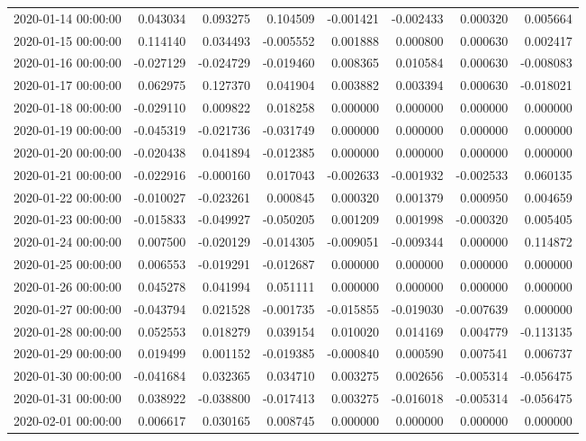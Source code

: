 \begin{tabular}{lrrrrrrr}
2020-01-14 00:00:00 & 0.043034 & 0.093275 & 0.104509 & -0.001421 & -0.002433 & 0.000320 & 0.005664 \\
2020-01-15 00:00:00 & 0.114140 & 0.034493 & -0.005552 & 0.001888 & 0.000800 & 0.000630 & 0.002417 \\
2020-01-16 00:00:00 & -0.027129 & -0.024729 & -0.019460 & 0.008365 & 0.010584 & 0.000630 & -0.008083 \\
2020-01-17 00:00:00 & 0.062975 & 0.127370 & 0.041904 & 0.003882 & 0.003394 & 0.000630 & -0.018021 \\
2020-01-18 00:00:00 & -0.029110 & 0.009822 & 0.018258 & 0.000000 & 0.000000 & 0.000000 & 0.000000 \\
2020-01-19 00:00:00 & -0.045319 & -0.021736 & -0.031749 & 0.000000 & 0.000000 & 0.000000 & 0.000000 \\
2020-01-20 00:00:00 & -0.020438 & 0.041894 & -0.012385 & 0.000000 & 0.000000 & 0.000000 & 0.000000 \\
2020-01-21 00:00:00 & -0.022916 & -0.000160 & 0.017043 & -0.002633 & -0.001932 & -0.002533 & 0.060135 \\
2020-01-22 00:00:00 & -0.010027 & -0.023261 & 0.000845 & 0.000320 & 0.001379 & 0.000950 & 0.004659 \\
2020-01-23 00:00:00 & -0.015833 & -0.049927 & -0.050205 & 0.001209 & 0.001998 & -0.000320 & 0.005405 \\
2020-01-24 00:00:00 & 0.007500 & -0.020129 & -0.014305 & -0.009051 & -0.009344 & 0.000000 & 0.114872 \\
2020-01-25 00:00:00 & 0.006553 & -0.019291 & -0.012687 & 0.000000 & 0.000000 & 0.000000 & 0.000000 \\
2020-01-26 00:00:00 & 0.045278 & 0.041994 & 0.051111 & 0.000000 & 0.000000 & 0.000000 & 0.000000 \\
2020-01-27 00:00:00 & -0.043794 & 0.021528 & -0.001735 & -0.015855 & -0.019030 & -0.007639 & 0.000000 \\
2020-01-28 00:00:00 & 0.052553 & 0.018279 & 0.039154 & 0.010020 & 0.014169 & 0.004779 & -0.113135 \\
2020-01-29 00:00:00 & 0.019499 & 0.001152 & -0.019385 & -0.000840 & 0.000590 & 0.007541 & 0.006737 \\
2020-01-30 00:00:00 & -0.041684 & 0.032365 & 0.034710 & 0.003275 & 0.002656 & -0.005314 & -0.056475 \\
2020-01-31 00:00:00 & 0.038922 & -0.038800 & -0.017413 & 0.003275 & -0.016018 & -0.005314 & -0.056475 \\
2020-02-01 00:00:00 & 0.006617 & 0.030165 & 0.008745 & 0.000000 & 0.000000 & 0.000000 & 0.000000 \\

\end{tabular}
